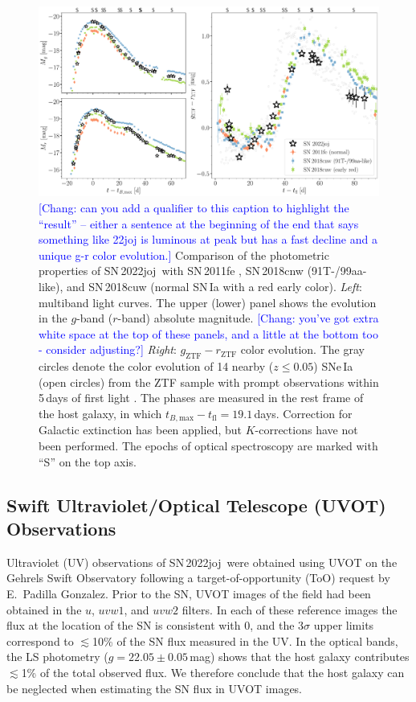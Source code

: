 \documentclass[twocolumn]{aastex631}
\newcommand{\sn}{SN\,2022joj}
\newcommand{\chang}[1]{\textcolor{blue}{[Chang: #1]}}
\begin{document}
\begin{CJK*}{UTF8}{gbsn}
\begin{figure}
    \centering
    \includegraphics[width=\textwidth]{photometry.pdf}
    \caption{\chang{can you add a qualifier to this caption to highlight the ``result'' -- either a sentence at the beginning of the end that says something like 22joj is luminous at peak but has a fast decline and a unique g-r color evolution.} Comparison of the photometric properties of \sn\ with SN\,2011fe \citep[normal SN\,Ia;][]{Pereira_2013}, SN\,2018cnw (91T-/99aa-like), and SN\,2018cuw (normal SN\,Ia with a red early color). \textit{Left}: multiband light curves. The upper (lower) panel shows the evolution in the $g$-band ($r$-band) absolute magnitude. \chang{you've got extra white space at the top of these panels, and a little at the bottom too - consider adjusting?}
    \textit{Right}: $g_\mathrm{ZTF}-r_\mathrm{ZTF}$ color evolution. 
    The gray circles denote the color evolution of 14 nearby ($z\le0.05$) SNe\,Ia (open circles) from the ZTF sample with prompt observations within 5\,days of first light \citep{Bulla2020}. The phases are measured in the rest frame of the host galaxy, in which $t_{B, \mathrm{max}} - t_\mathrm{fl}=19.1$\,days. Correction for Galactic extinction has been applied, but $K$-corrections have not been performed. The epochs of optical spectroscopy are marked with ``S'' on the top axis.}
    \label{fig:lc}
\end{figure}

\subsection{Swift Ultraviolet/Optical Telescope (UVOT) Observations}
Ultraviolet (UV) observations of \sn\ were obtained using UVOT \citep{UVOT_2005} on the Gehrels Swift Observatory \citep[Swift;][]{Swift_2004} following a target-of-opportunity (ToO) request by E.~Padilla Gonzalez. Prior to the SN, UVOT images of the field had been obtained in the $u$, $uvw1$, and $uvw2$ filters. In each of these reference images the flux at the location of the SN is consistent with 0, and the 3$\sigma$ upper limits correspond to $\lesssim$10\% of the SN flux measured in the UV. In the optical bands, the LS photometry ($g = 22.05\pm0.05$\,mag) shows that the host galaxy contributes $\lesssim$1\% of the total observed flux. We therefore conclude that the host galaxy can be neglected when estimating the SN flux in UVOT images.


\end{CJK*}
\end{document}
